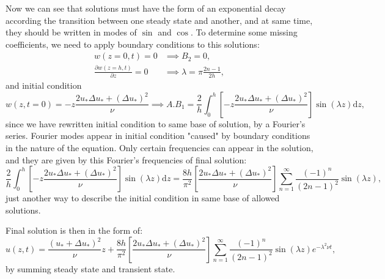 \begin{anexosenv}
    Now we can see that solutions must have the form of an exponential decay according the transition between one steady state and another, and at same time, they should be written in modes of $\sin$ and $\cos$. To determine some missing coefficients, we need to apply boundary conditions to this solutions:
    \begin{subequations}
        \begin{align}
            w(z=0,t) = 0 & \implies B_2 = 0, \\
            \frac{\partial w(z=h,t)}{\partial z} = 0 & \implies \lambda = \pi \frac{2n-1}{2h},
        \end{align}
    \end{subequations}
and initial condition
    \begin{equation}
        w(z,t=0) = -z\frac{2u_*\Delta u_* +\left(\Delta u_*\right)^2}{\nu} \implies A.B_1 = \frac{2}{h}\int_0^h\left[-z\frac{2u_*\Delta u_* +\left(\Delta u_*\right)^2}{\nu}\right]\sin\left(\lambda z\right)\mathrm{d}z,
    \end{equation}
since we have rewritten initial condition to same base of solution, by a Fourier's series. Fourier modes appear in initial condition "caused" by boundary conditions in the nature of the equation. Only certain frequencies can appear in the solution, and they are given by this Fourier's frequencies of final solution:
    \begin{equation}
        \frac{2}{h}\int_0^h\left[-z\frac{2u_*\Delta u_* +\left(\Delta u_*\right)^2}{\nu}\right]\sin\left(\lambda z\right)\mathrm{d}z = 
        \frac{8h}{\pi^2}\left[\frac{2u_*\Delta u_* +\left(\Delta u_*\right)^2}{\nu}\right]\sum_{n=1}^\infty\frac{\left(-1\right)^n}{\left(2n-1\right)^2}\sin\left(\lambda z\right),
    \end{equation}
just another way to describe the initial condition in same base of allowed solutions.

Final solution is then in the form of:
    \begin{equation}
        u(z,t) = \frac{\left(u_*+\Delta u_*\right)^2}{\nu}z +\frac{8h}{\pi^2}\left[\frac{2u_*\Delta u_* +\left(\Delta u_*\right)^2}{\nu}\right]\sum_{n=1}^\infty\frac{\left(-1\right)^n}{\left(2n-1\right)^2}\sin\left(\lambda z\right)e^{-\lambda^2\nu t},
    \end{equation}
by summing steady state and transient state.



\end{anexosenv}
